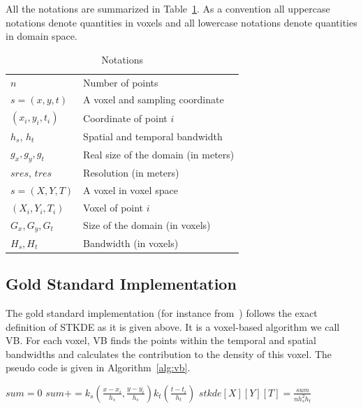 \documentclass{article}
\begin{document}
All the notations are summarized in Table~\ref{tab:notation}. As a
convention all uppercase notations denote quantities in voxels and all
lowercase notations denote quantities in domain space.

\begin{table}
  \centering
  \begin{tabular}{|l|l|}
    \hline 
    $n$ & Number of points\\
    $s = (x,y,t)$ & A voxel and sampling coordinate\\
    $(x_i, y_i, t_i)$ & Coordinate of point $i$\\
    $h_s$, $h_t$ & Spatial and temporal bandwidth \\ 
    $g_x, g_y, g_t$ & Real size of the domain (in meters) \\
    \hline
    $sres$, $tres$ & Resolution (in meters) \\
    $s = (X,Y,T)$ & A voxel in voxel space\\
    $(X_i, Y_i, T_i)$ & Voxel of point $i$\\
    $G_x, G_y, G_t$ & Size of the domain (in voxels)\\
    $H_s, H_t$ & Bandwidth (in voxels) \\
    \hline 
  \end{tabular}
  \caption{Notations}
  \label{tab:notation}
\end{table}



\subsection{Gold Standard Implementation}

The gold standard implementation (for instance from~\cite{Hohl16}) follows the exact definition of STKDE
as it is given above. It is a voxel-based algorithm we call VB. For
each voxel, VB finds the points within the temporal and spatial bandwidths and calculates the contribution
to the density of this voxel. The pseudo code is given in Algorithm~\ref{alg:vb}.

\begin{algorithm}
\caption{\textsc{VB}}
\begin{algorithmic}
\State $sum = 0$
    \State $sum += k_s(\frac{x-x_i}{h_s},\frac{y-y_i}{h_s}) k_t(\frac{t-t_i}{h_t})$
    \EndIf
  \EndFor
  \State $stkde[X][Y][T] = \frac{sum}{n h_s^2h_t}$
\EndFor
\end{algorithmic}
\label{alg:vb}
\end{algorithm}
\end{document}
